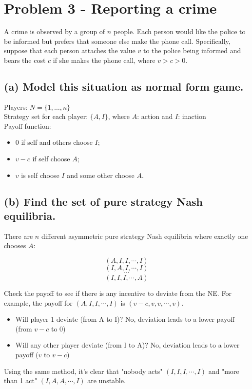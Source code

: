 \documentclass{article}
\begin{document}
\section{Problem 3 - Reporting a crime}

A crime is observed by a group of $n$ people. Each person would like the police to be informed
but prefers that someone else make the phone call. Specifically, suppose that each person
attaches the value $v$ to the police being informed and bears the cost $c$ if she makes the
phone call, where $v > c > 0$.

\subsection*{(a) Model this situation as normal form game.}  


 Players: $N = \{1, \dots , n \}$ \\ 
 Strategy set for each player: $\{A, I \}$, where $A$: action and $I$: inaction \\ 
 Payoff function: 

\begin{itemize}
\item $0$ if self and others choose $I$; 
\item $v-c$ if self choose $A$; 
\item $v$ is self choose $I$ and some other choose $A$.
\end{itemize}




%
\subsection*{(b) Find the set of pure strategy Nash equilibria. } 

There are $n$ different asymmetric pure strategy Nash equilibria where exactly one chooses $A$:

$$(A,I,I,\cdots,I)$$
$$(I,A,I,\cdots,I)$$
$$\cdots$$
$$(I,I,I,\cdots,A)$$

\begin{mdframed}[backgroundcolor=blue!20,linecolor=white]

Check the payoff to see if there is any incentive to deviate from the NE. For example, the payoff for
$(A,I,I,\cdots,I)$ is $(v-c,v,v,\cdots,v)$.

\begin{itemize}
\item Will player 1 deviate (from A to I)? No, deviation leads to a lower payoff (from $v-c$ to $0$)
\item Will any other player deviate (from I to A)? No, deviation leads to a lower payoff ($v$ to $v-c$)
\end{itemize}

Using the same method, it's clear that "nobody acts" $(I,I,I,\cdots,I)$ and "more than 1 act" $(I,A,A,\cdots,I)$ are
unstable.
\end{mdframed}
\end{document}

